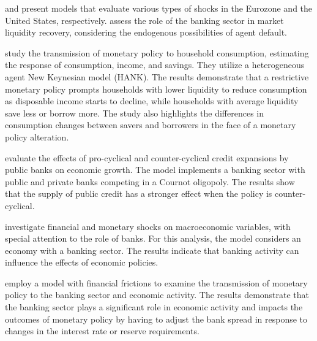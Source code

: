 \documentclass[
	thesis.tex
	]{subfiles}
\begin{document}
	\textcite{smets_estimated_2003} and \textcite{smets_shocks_2007} present models that evaluate various types of shocks in the Eurozone and the United States, respectively. \textcite{walque_financial_2010} assess the role of the banking sector in market liquidity recovery, considering the endogenous possibilities of agent default.
	
	\textcite{holm_transmission_2021} study the transmission of monetary policy to household consumption, estimating the response of consumption, income, and savings. They utilize a heterogeneous agent New Keynesian model (HANK). The results demonstrate that a restrictive monetary policy prompts households with lower liquidity to reduce consumption as disposable income starts to decline, while households with average liquidity save less or borrow more. The study also highlights the differences in consumption changes between savers and borrowers in the face of a monetary policy alteration.
	
	\textcite{capeleti_countercyclical_2022} evaluate the effects of pro-cyclical and counter-cyclical credit expansions by public banks on economic growth. The model implements a banking sector with public and private banks competing in a Cournot oligopoly. The results show that the supply of public credit has a stronger effect when the policy is counter-cyclical.
	
	\textcite{soltani_investigating_2021} investigate financial and monetary shocks on macroeconomic variables, with special attention to the role of banks. For this analysis, the model considers an economy with a banking sector. The results indicate that banking activity can influence the effects of economic policies.
	
	\textcite{vinhado_politica_2016} employ a model with financial frictions to examine the transmission of monetary policy to the banking sector and economic activity. The results demonstrate that the banking sector plays a significant role in economic activity and impacts the outcomes of monetary policy by having to adjust the bank spread in response to changes in the interest rate or reserve requirements.
	
\end{document}
